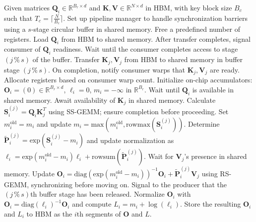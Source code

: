 \begin{algorithm}[H]
    \caption{\small\label{alg:flash3_wgmma_ws_only}\textsc{FlashAttention-3} forward computation \textbf{without} overlapping among consumer groups -- CTA perspective}
    \begin{algorithmic}[1]
\REQUIRE Given matrices $\mathbf{Q}_i \in \mathbb{R}^{B_r \times d}$ and $\mathbf{K}, \mathbf{V} \in \mathbb{R}^{N \times d}$ in HBM, with key block size $B_c$ such that $T_c = \lceil \frac{N}{B_c} \rceil$.
\STATE Set up pipeline manager to handle synchronization barriers using a $s$-stage circular buffer in shared memory.
\STATE Free a predefined number of registers.
\STATE Load $\mathbf{Q}_i$ from HBM to shared memory.
\STATE After transfer completes, signal consumer of $\mathbf{Q}_i$ readiness.
    \STATE Wait until the consumer completes access to stage $(j\,\%\,s)$ of the buffer.
    \STATE Transfer $\mathbf{K}_j, \mathbf{V}_j$ from HBM to shared memory in buffer stage $(j\,\%\,s)$.
    \STATE On completion, notify consumer warps that $\mathbf{K}_j, \mathbf{V}_j$ are ready.
\ENDFOR
\ELSE \STATE Allocate registers based on consumer warp count.
\STATE Initialize on-chip accumulators: $\mathbf{O}_i = (0) \in \mathbb{R}^{B_r \times d}$, $\ell_i = 0$, $m_i = -\infty$ in $\mathbb{R}^{B_r}$.
\STATE Wait until $\mathbf{Q}_i$ is available in shared memory.
\STATE Await availability of $\mathbf{K}_j$ in shared memory.
\STATE Calculate $\mathbf{S}_i^{(j)} = \mathbf{Q}_i \mathbf{K}_j^T$ using SS-GEMM; ensure completion before proceeding. \label{alg:ws_only_gemm1}
\STATE Set $m_i^{\mathrm{old}} = m_i$ and update $m_i = \mathrm{max}(m_i^{\mathrm{old}}, \mathrm{rowmax}(\mathbf{S}_i^{(j)}))$. \label{code-ws:softmax_start}
\STATE Determine $\widetilde{\mathbf{P}}_i^{(j)} = \mathrm{exp}(\mathbf{S}_i^{(j)} - m_i)$ and update normalization as $\ell_i = \mathrm{exp}(m_i^{\mathrm{old}} - m_i) \ell_i + \mathrm{rowsum}(\widetilde{\mathbf{P}}_i^{(j)})$. \label{code-ws:softmax_end}
\STATE Wait for $\mathbf{V}_j$'s presence in shared memory.
\STATE Update $\mathbf{O}_i = \mathrm{diag}(\mathrm{exp}(m_i^{\mathrm{old}} - m_i))^{-1} \mathbf{O}_i + \widetilde{\mathbf{P}}_i^{(j)} \mathbf{V}_j$ using RS-GEMM, synchronizing before moving on. \label{alg:ws_only_gemm2}
\STATE Signal to the producer that the $(j\,\%\,s)$th buffer stage has been released.
\ENDFOR
\STATE Normalize $\mathbf{O}_i$ with $\mathbf{O}_i = \mathrm{diag}(\ell_i)^{-1} \mathbf{O}_i$ and compute $L_i = m_i + \log(\ell_i)$.
\STATE Store the resulting $\mathbf{O}_i$ and $L_i$ to HBM as the $i$th segments of $\mathbf{O}$ and $L$.
\ENDIF
\end{algorithmic}
\end{algorithm}

